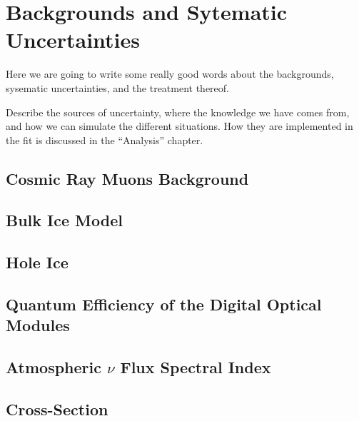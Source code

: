 \documentclass[../Main.tex]{subfiles}
\begin{document}
       {}       {}
    {}    {}
 {} {}


\graphicspath{{figures/}{Modeling/figures/}}


\section{Backgrounds and Sytematic Uncertainties}\label{sec:BackgroundSystematics}

Here we are going to write some really good words about the
backgrounds, sysematic uncertainties, and the treatment thereof.

Describe the sources of uncertainty, where the knowledge we have comes from, and how we can simulate the different situations. How they are implemented in the fit is discussed in the ``Analysis'' chapter.

\subsection{Cosmic Ray Muons Background}\label{sec:CosmicRayMuons}

\subsection{Bulk Ice Model}\label{sec:BulkIce}

\subsection{Hole Ice}\label{sec:HoleIce}

\subsection{Quantum Efficiency of the Digital Optical Modules}\label{sec:DOMEff}

\subsection{Atmospheric $\nu$ Flux Spectral
  Index}\label{sec:SpectralIndex}

\subsection{Cross-Section}\label{sec:CrossSection}


\end{document}
